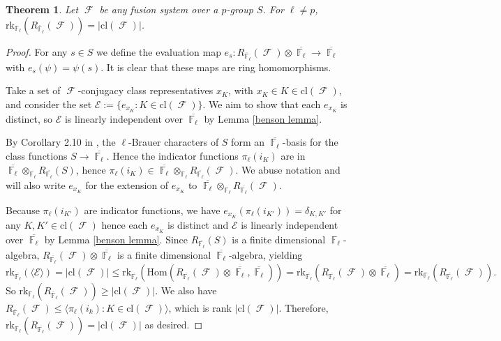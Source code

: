 \documentclass[12pt]{article}
\DeclareMathOperator{\F}{\mathbb{F}}
\DeclareMathOperator{\sF}{\mathcal{F}}
\theoremstyle{plain}
\newcounter{thmsection}
\newtheorem{thm}{Theorem}[thmsection]
\theoremstyle{definition}
\begin{document}
\begin{thm}\label{mod rank theorem}
Let $\sF$ be any fusion system over a $p$-group $S$. For $\ell \neq p$, $\text{rk}_{\F_{\ell}}(R_{\overline{\F}_{\ell}}(\sF)) = |\text{cl}(\sF)|$.
\end{thm}
\begin{proof}
For any $s \in S$ we define the evaluation map $e_s \colon R_{\overline{\F}_{\ell}}(\sF) \otimes \overline{\F_{\ell}} \rightarrow \overline{\F_{\ell}}$ with $e_s(\psi) = \psi(s)$. 
It is clear that these maps are ring homomorphisms. 

Take a set of $\sF$-conjugacy class representatives $x_K$, with $x_K \in K \in \text{cl}(\sF)$, and consider the set $\mathscr{E} := \{e_{x_K} \colon K \in \text{cl}(\sF)\}$. 
We aim to show that each $e_{x_K}$ is distinct, so $\mathscr{E}$ is linearly independent over $\overline{\F_{\ell}}$ by Lemma \ref{benson lemma}.

By Corollary 2.10 in \cite{navarro}, the $\ell$-Brauer characters of $S$ form an $\overline{\F_{\ell}}$-basis for the class functions $S \rightarrow \overline{\F_{\ell}}$. Hence the indicator functions $\pi_{\ell}(i_K)$ are in $\overline{\F_{\ell}} \otimes_{\F_{\ell}} R_{\overline{\F_{\ell}}}(S)$, hence $\pi_{\ell}(i_K) \in \overline{\F_{\ell}} \otimes_{\F_{\ell}} R_{\overline{\F_{\ell}}}(\sF)$. We abuse notation and will also write $e_{x_K}$ for the extension of $e_{x_K}$ to $\overline{\F_{\ell}} \otimes_{\F_{\ell}} R_{\overline{\F_{\ell}}}(\sF)$.

Because $\pi_{\ell}(i_{K'})$ are indicator functions, we have $e_{x_K}(\pi_{\ell}(i_{K'})) = \delta_{K,K'}$ for any $K, K' \in \text{cl}(\sF)$ hence each $e_{x_K}$ is distinct and $\mathscr{E}$ is linearly independent over $\overline{\F_{\ell}}$ by Lemma \ref{benson lemma}.
Since $R_{\overline{\F_{\ell}}}(S)$ is a finite dimensional $\F_{\ell}$-algebra, $R_{\overline{\F_{\ell}}}(\sF) \otimes \overline{\F_{\ell}}$ is a finite dimensional $\overline{\F_{\ell}}$-algebra, yielding
\[\text{rk}_{\overline{\F_{\ell}}}(\langle\mathscr{E}\rangle) = |\text{cl}(\sF)| \leq \text{rk}_{\overline{\F_{\ell}}}(\mathrm{Hom}(R_{\overline{\F_{\ell}}}(\sF) \otimes \overline{\F_{\ell}}, \overline{\F_{\ell}})) = \text{rk}_{\overline{\F_{\ell}}}(R_{\overline{\F_{\ell}}}(\sF) \otimes \overline{\F_{\ell}}) = \text{rk}_{\F_{\ell}}(R_{\overline{\F_{\ell}}}(\sF)).\]
So $\text{rk}_{\F_{\ell}}(R_{\overline{\F}_{\ell}}(\sF)) \geq |\text{cl}(\sF)|$. 
We also have $R_{\overline{\F}_{\ell}}(\sF) \leq \langle \pi_{\ell}(i_k) \colon K \in \text{cl}(\sF) \rangle$, which is rank $|\text{cl}(\sF)|$.
 Therefore, $\text{rk}_{\F_{\ell}}(R_{\overline{\F_{\ell}}}(\sF)) = |\text{cl}(\sF)|$ as desired.
\end{proof}
\end{document}
